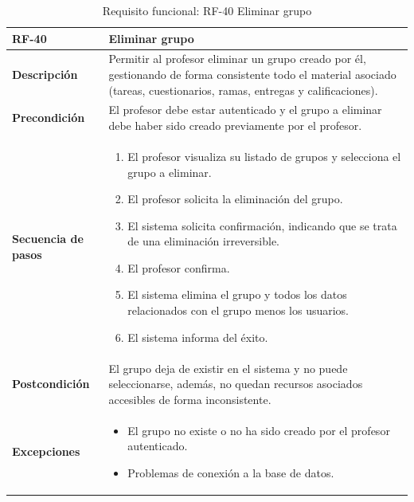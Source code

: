 \begin{table}[H]
\centering
\begin{tabularx}{\textwidth}{
  |>{\centering\arraybackslash}l
  |>{\centering\arraybackslash}X|}
\hline
\textbf{RF-40} & \textbf{Eliminar grupo} \\ \hline
\textbf{Descripción} & Permitir al profesor eliminar un grupo creado por él, gestionando de forma consistente todo el material asociado (tareas, cuestionarios, ramas, entregas y calificaciones). \\ \hline
\textbf{Precondición} & El profesor debe estar autenticado y el grupo a eliminar debe haber sido creado previamente por el profesor. \\ \hline
\textbf{Secuencia de pasos} &
\begin{enumerate}
  \item El profesor visualiza su listado de grupos y selecciona el grupo a eliminar.
  \item El profesor solicita la eliminación del grupo.
  \item El sistema solicita confirmación, indicando que se trata de una eliminación irreversible.
  \item El profesor confirma.
  \item El sistema elimina el grupo y todos los datos relacionados con el grupo menos los usuarios.
  \item El sistema informa del éxito.
\end{enumerate} \\ \hline
\textbf{Postcondición} & El grupo deja de existir en el sistema y no puede seleccionarse, además, no quedan recursos asociados accesibles de forma inconsistente. \\ \hline
\textbf{Excepciones} &
\begin{itemize}
  \item El grupo no existe o no ha sido creado por el profesor autenticado.
  \item Problemas de conexión a la base de datos.
\end{itemize} \\ \hline
\end{tabularx}
\caption{Requisito funcional: RF-40 Eliminar grupo}
\end{table}

